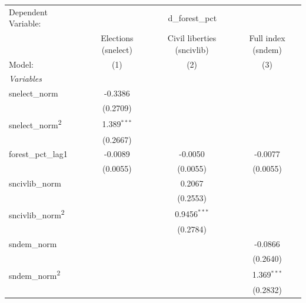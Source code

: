 
\begingroup
\centering
\begin{tabular}{lccc}
   \tabularnewline \midrule \midrule
   Dependent Variable: & \multicolumn{3}{c}{d\_forest\_pct}\\
                                       & Elections (snelect) & Civil liberties (sncivlib) & Full index (sndem) \\   
   Model:                              & (1)                 & (2)                        & (3)\\  
   \midrule
   \emph{Variables}\\
   snelect\_norm                       & -0.3386             &                            &   \\   
                                       & (0.2709)            &                            &   \\   
   snelect\_norm\textsuperscript{2}    & 1.389$^{***}$       &                            &   \\   
                                       & (0.2667)            &                            &   \\   
   forest\_pct\_lag1                   & -0.0089             & -0.0050                    & -0.0077\\   
                                       & (0.0055)            & (0.0055)                   & (0.0055)\\   
   sncivlib\_norm                      &                     & 0.2067                     &   \\   
                                       &                     & (0.2553)                   &   \\   
   sncivlib\_norm\textsuperscript{2}   &                     & 0.9456$^{***}$             &   \\   
                                       &                     & (0.2784)                   &   \\   
   sndem\_norm                         &                     &                            & -0.0866\\   
                                       &                     &                            & (0.2640)\\   
   sndem\_norm\textsuperscript{2}      &                     &                            & 1.369$^{***}$\\   
                                       &                     &                            & (0.2832)\\   
   \midrule

\end{tabular}
